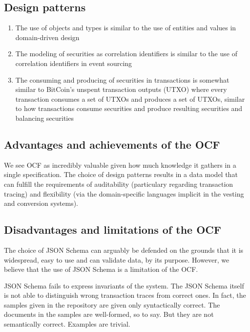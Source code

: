 \subsection{Design patterns}

\begin{enumerate}
	\item The use of objects and types is similar to the use of entities and values in domain-driven design
	\item The modeling of securities as correlation identifiers is similar to the use of correlation identifiers in event sourcing
	\item The consuming and producing of securities in transactions is somewhat similar to BitCoin's unspent transaction outputs (UTXO) where every transaction consumes a set of UTXOs and produces a set of UTXOs, similar to how transactions consume securities and produce resulting securities and balancing securities
\end{enumerate}

\subsection{Advantages and achievements of the OCF}

We see OCF as incredibly valuable given how much knowledge it gathers in a single specification. The choice of design patterns results in a data model that can fulfill the requirements of auditability (particulary regarding transaction tracing) and flexibility (via the domain-specific languages implicit in the vesting and conversion systems).

\subsection{Disadvantages and limitations of the OCF}

The choice of JSON Schema can arguably be defended on the grounds that it is widespread, easy to use and can validate data, by its purpose. However, we believe that the use of JSON Schema is a limitation of the OCF.

JSON Schema fails to express invariants of the system. The JSON Schema itself is not able to distinguish wrong transaction traces from correct ones. In fact, the samples given in the repository are given only syntactically correct. The documents in the samples are well-formed, so to say. But they are not semantically correct. Examples are trivial.

